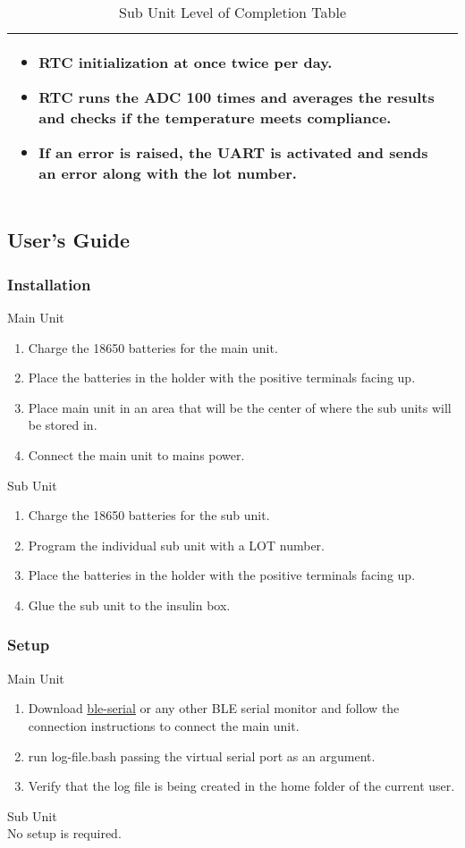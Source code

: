 \begin{landscape}
\begin{table}[!ht]
\begin{tabularx}{\textwidth}{|X|X|}
\begin{itemize}
          \item RTC initialization at once twice per day.
          \item RTC runs the ADC 100 times and averages the results and checks if the temperature meets compliance.
          \item If an error is raised, the UART is activated and sends an error along with the lot number.
        \end{itemize}\\
      \hline
    \end{tabularx}
    \caption{Sub Unit Level of Completion Table}
    \label{tab:sub-unit-completion-table}
  \end{table}
\end{landscape}
\subsection{User’s Guide}
\subsubsection{Installation}
\large{Main Unit}
\normalsize
\linespread{2.0}
\begin{enumerate}
  \item Charge the 18650 batteries for the main unit.
  \item Place the batteries in the holder with the positive terminals facing up.
  \item Place main unit in an area that will be the center of where the sub units will be stored in.
  \item Connect the main unit to mains power.
\end{enumerate}
\large{Sub Unit}
\normalsize
\linespread{2.0}
\begin{enumerate}
  \item Charge the 18650 batteries for the sub unit.
  \item Program the individual sub unit with a LOT number.
  \item Place the batteries in the holder with the positive terminals facing up.
  \item Glue the sub unit to the insulin box.
\end{enumerate}
\subsubsection{Setup}
\large{Main Unit}
\normalsize
\begin{enumerate}
  \item Download \href{https://pypi.org/project/ble-serial/}{ble-serial} or any other BLE serial monitor and follow the connection instructions to connect the main unit.
  \item run log-file.bash passing the virtual serial port as an argument.
  \item Verify that the log file is being created in the home folder of the current user.
\end{enumerate}
\large{Sub Unit\\}
\normalsize
No setup is required.
